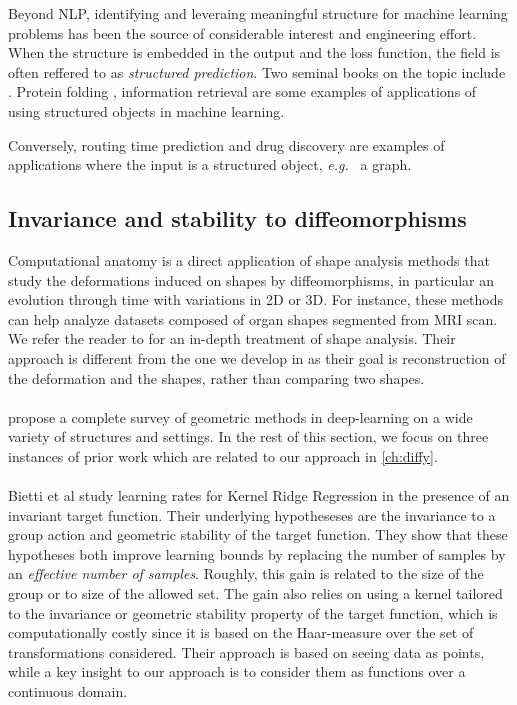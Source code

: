 Beyond NLP, identifying and leveraing meaningful structure for machine learning problems has been the source of considerable interest and engineering effort. When the structure is embedded in the output and the loss function, the field is often reffered to as \emph{structured prediction}. Two seminal books on the topic include \citep{advancedStructuredPrediction2014MIT,bakir2007predicting}. Protein folding  \cite{joachims2009}, information retrieval \cite{duchi2010} are some examples of applications of using structured objects in machine learning.

Conversely, routing time prediction \citep{deepmind-traffic} and drug discovery \citep{stokes-antibiotics} are examples of applications where the input is a structured object, \emph{e.g.\ } a graph.

\subsection{Invariance and stability to diffeomorphisms}

Computational anatomy is a direct application of shape analysis methods that study the deformations induced on shapes by diffeomorphisms, in particular an evolution through time with variations in 2D or 3D. For instance, these methods can help analyze datasets composed of organ shapes segmented from MRI scan. We refer the reader to \cite{younes} for an in-depth treatment of shape analysis. Their approach is different from the one we develop in \cite{ch:diffy} as their goal is reconstruction of the deformation and the shapes, rather than comparing two shapes.

\paragraph{}
\cite{bronstein-geometric-deep-learning} propose a complete survey of geometric methods in deep-learning on a wide variety of structures and settings. In the rest of this section, we focus on three instances of prior work which are related to our approach in \cref{ch:diffy}.

\paragraph{}
Bietti et al study learning rates for Kernel Ridge Regression in the presence of an invariant target function. Their underlying hypotheseses are the invariance to a group action and geometric stability of the target function. They show that these hypotheses both improve learning bounds by replacing the number of samples by an \emph{effective number of samples}. Roughly, this gain is related to the size of the group or to size of the allowed set. The gain also relies on using a kernel tailored to the invariance or geometric stability property of the target function, which is computationally costly since it is based on the Haar-measure over the set of transformations considered. Their approach is based on seeing data as points, while a key insight to our approach is to consider them as functions over a continuous domain.

